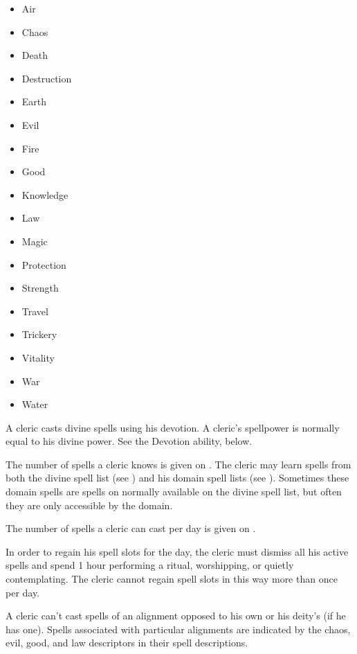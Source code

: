 \begin{itemize}
    \item{Air} 
    \item{Chaos}
    \item{Death}
    \item{Destruction} 
    \item{Earth}
    \item{Evil}
    \item{Fire}
    \item{Good}
    \item{Knowledge}
    \item{Law}
    \item{Magic}
    \item{Protection}
    \item{Strength}
    \item{Travel}
    \item{Trickery}
    \item{Vitality}
    \item{War}
    \item{Water}
\end{itemize}

A cleric casts divine spells using his devotion.
A cleric's spellpower is normally equal to his divine power.
See the Devotion ability, below.

The number of spells a cleric knows is given on .
The cleric may learn spells from both the divine spell list (see ) and his domain spell lists (see ).
Sometimes these domain spells are spells on normally available on the divine spell list, but often they are only accessible by the domain.

The number of spells a cleric can cast per day is given on .

In order to regain his spell slots for the day, the cleric must dismiss all his active spells and spend 1 hour performing a ritual, worshipping, or quietly contemplating.
The cleric cannot regain spell slots in this way more than once per day.

A cleric can't cast spells of an alignment opposed to his own or his deity's (if he has one).
Spells associated with particular alignments are indicated by the chaos, evil, good, and law descriptors in their spell descriptions.

